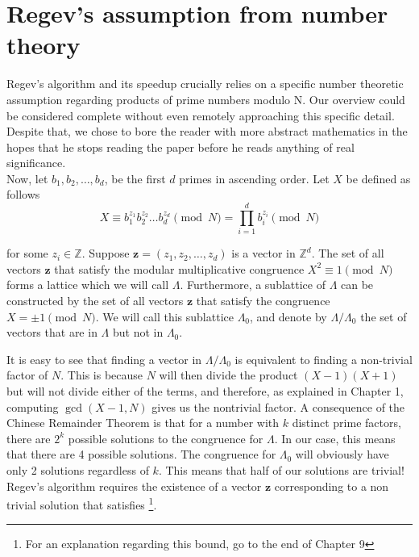 \chapter{Regev's assumption from number theory}

Regev's algorithm and its speedup crucially relies on a specific number theoretic assumption regarding products of prime numbers modulo N. Our overview could be considered complete without even remotely approaching this specific detail. Despite that, we chose to bore the reader with more abstract mathematics in the hopes that he stops reading the paper before he reads anything of real significance.\\


Now, let $b_1,b_2,\dots ,b_d$, be the first $d$ primes in ascending order. Let $X$ be defined as follows
\begin{equation}
    X \equiv b_1^{z_1}b_2^{z_2}\dots b_d^{z_d} \pmod N = \prod_{i=1}^d b_i ^{z_i} \pmod N
\end{equation}

for some $z_i \in \mathbb{Z}$. Suppose $\mathbf{z} = (z_1,z_2,\dots,z_d)$ is a vector in $\mathbb{Z}^d$. The set of all vectors $\mathbf{z}$ that satisfy the modular multiplicative congruence $X^2 \equiv 1 \pmod N$ forms a lattice which we will call $\mathit \Lambda$. Furthermore, a sublattice of $\mathit \Lambda$ can be constructed by the set of all vectors $\mathbf{z}$ that satisfy the congruence $X = \pm 1 \pmod N$. We will call this sublattice $\mathit \Lambda_0$, and denote by $\Lambda / \Lambda_0$ the set of vectors that are in $\mathit \Lambda$ but not in $\mathit \Lambda_0$. 

It is easy to see that finding a vector in $\Lambda / \Lambda_0$ is equivalent to finding a non-trivial factor of $N$. This is because $N$ will then divide the product $(X-1)(X+1)$ but will not divide either of the terms, and therefore, as explained in Chapter 1, computing $\gcd(X-1,N)$ gives us the nontrivial factor. A consequence of the Chinese Remainder Theorem is that for a number with $k$ distinct prime factors, there are $2^{k}$ possible solutions to the congruence for $\mathit \Lambda$. In our case, this means that there are 4 possible solutions. The congruence for $\mathit \Lambda_0$ will obviously have only 2 solutions regardless of $k$. This means that half of our solutions are trivial! Regev’s algorithm requires the existence of a vector $\mathbf{z}$ corresponding to a non trivial solution that satisfies \footnote{For an explanation regarding this bound, go to the end of Chapter 9}. 


